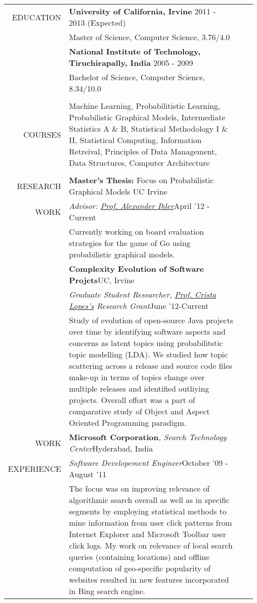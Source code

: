 \documentclass[a4paper]{article}
\begin{document}
\noindent
\begin{tabularx}{\textwidth}{rX lX}
  EDUCATION & \textbf{University of California, Irvine} \hfill 2011 - 2013 (Expected)\\
  & Master of Science, Computer Science, 3.76/4.0\\
  [.5\baselineskip]
  & \textbf{National Institute of Technology, Tiruchirapally, India} \hfill 2005 - 2009\\
  & Bachelor of Science, Computer Science, 8.34/10.0\\
  \\*
  COURSES & Machine Learning, Probabilitistic Learning, Probabilistic Graphical Models, Intermediate Statistics A \& B, Statistical Methodology I \& II, Statistical Computing, Information Retreival, Principles of Data Management, Data Structures, Computer Architecture\\
  \\*
  RESEARCH & \textbf{Master's Thesis:} Focus on Probabilistic Graphical Models \hfill UC Irvine\\
  WORK & \textit{Advisor: \href{http://www.ics.uci.edu/~ihler}{Prof. Alexander Ihler}}\hfill April '12 - Current\\
  & Currently working on board evaluation strategies for the game of Go using probabilistic graphical models.\\
  [.5\baselineskip]
  & \textbf{Complexity Evolution of Software Projcts}\hfill UC, Irvine\\
  & \textit{Graduate Student Researcher, \href{http://www.ics.uci.edu/~lopes/}{Prof. Crista Lopes's} Research Grant}\hfill June '12-Current\\
  & Study of evolution of open-source Java projects over time by identifying software aspects and concerns as latent topics using probabilitstic topic modelling (LDA). We studied how topic scattering across a release and source code files make-up in terms of topics change over multiple releases and identified outliying projects. Overall effort was a part of comparative study of Object and Aspect Oriented Programming paradigm.\\
  [.5\baselineskip]
  WORK & \textbf{Microsoft Corporation}\textit{, Search Technology Center}\hfill Hyderabad, India\\
  EXPERIENCE & \textit{Software Developement Engineer}\hfill October '09 - August '11\\
  & The focus was on improving relevance of algorithmic search overall as well as in specific segments by employing statistical methods to mine information from user click patterns from Internet Explorer and Microsoft Toolbar user click logs. My work on relevance of local search queries (containing locations) and offline computation of geo-specific popularity of websites resulted in new features incorporated in Bing search engine.\\

\end{tabularx}
\end{document}
